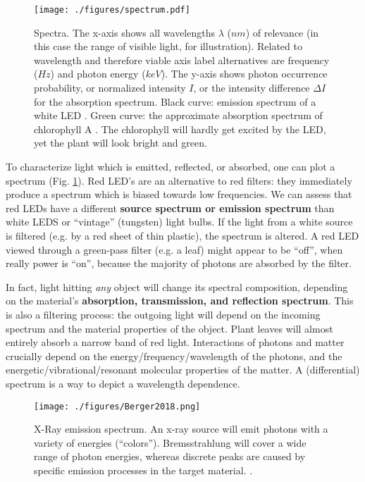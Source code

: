 \begin{figure}[htbp]
\centering
\texttt{[image: ./figures/spectrum.pdf]}
\caption{\label{fig:spectrum}Spectra. The x-axis shows all wavelengths \(\lambda\) (\(nm\)) of relevance (in this case the range of visible light, for illustration). Related to wavelength and therefore viable axis label alternatives are frequency (\(Hz\)) and photon energy (\(keV\)). The y-axis shows photon occurrence probability, or normalized intensity \(I\), or the intensity difference \(\Delta I\) for the absorption spectrum. Black curve: emission spectrum of a white LED \citep{Tanabe2005}. Green curve: the approximate absorption spectrum of chlorophyll A \citep{Zscheile1934}. The chlorophyll will hardly get excited by the LED, yet the plant will look bright and green.}
\end{figure}


To characterize light which is emitted, reflected, or absorbed, one can plot a spectrum (Fig. \ref{fig:spectrum}).
Red LED's are an alternative to red filters: they immediately produce a spectrum which is biased towards low frequencies.
We can assess that red LEDs have a different \textbf{source spectrum or emission spectrum} than white LEDS or ``vintage'' (tungsten) light bulbs.
If the light from a white source is filtered (e.g. by a red sheet of thin plastic), the spectrum is altered.
A red LED viewed through a green-pass filter (e.g. a leaf) might appear to be ``off'', when really power is ``on'', because the majority of photons are absorbed by the filter.

In fact, light hitting \emph{any} object will change its spectral composition, depending on the material's \textbf{absorption, transmission, and reflection spectrum}.
This is also a filtering process: the outgoing light will depend on the incoming spectrum and the material properties of the object.
Plant leaves will almost entirely absorb a narrow band of red light.
Interactions of photons and matter crucially depend on the energy/frequency/wavelength of the photons, and the energetic/vibrational/resonant molecular properties of the matter.
A (differential) spectrum is a way to depict a wavelength dependence.


\begin{figure}[htbp]
\centering
\texttt{[image: ./figures/Berger2018.png]}
\caption{\label{fig:xray_emission}X-Ray emission spectrum. An x-ray source will emit photons with a variety of energies (``colors''). Bremsstrahlung will cover a wide range of photon energies, whereas discrete peaks are caused by specific emission processes in the target material. \citep[taken from ][, creative commons license]{Berger2018fig8}.}
\end{figure}

